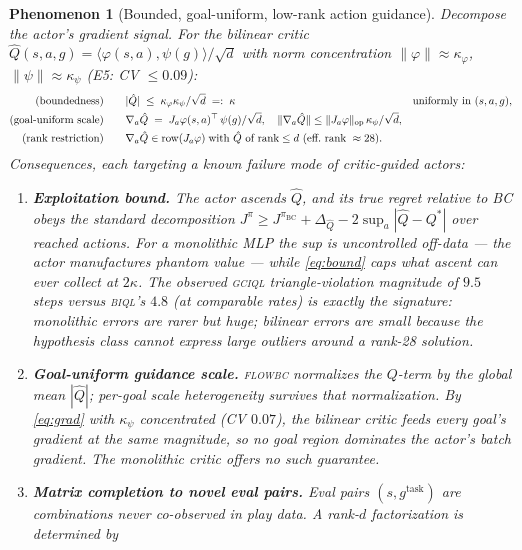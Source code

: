 \documentclass[10pt]{article}
\newtheorem{phenomenon}{Phenomenon}
\newcommand{\ip}[2]{\langle #1, #2 \rangle}
\begin{document}
\begin{phenomenon}[Bounded, goal-uniform, low-rank action guidance]\label{ph:mechanism}
Decompose the actor's gradient signal. For the bilinear critic
$\hat Q(s,a,g)=\ip{\varphi(s,a)}{\psi(g)}/\sqrt d$ with norm concentration
$\|\varphi\|\approx\kappa_\varphi$, $\|\psi\|\approx\kappa_\psi$ (E5: CV $\le0.09$):
\begin{align}
\text{(boundedness)}\qquad & |\hat Q| \;\le\; \kappa_\varphi\kappa_\psi/\sqrt d \;=:\;\kappa
&&\text{uniformly in } (s,a,g),\label{eq:bound}\\
\text{(goal-uniform scale)}\qquad & \nabla_a \hat Q \;=\; J_a\varphi(s,a)^\top\,\psi(g)/\sqrt d,
\quad \|\nabla_a \hat Q\|\le \|J_a\varphi\|_{\mathrm{op}}\,\kappa_\psi/\sqrt d,\label{eq:grad}\\
\text{(rank restriction)}\qquad & \nabla_a\hat Q \in
\operatorname{row}(J_a\varphi)\;\text{with } \hat Q \text{ of rank} \le d\ (\text{eff.\ rank }\approx 28).\notag
\end{align}
Consequences, each targeting a known failure mode of critic-guided actors:
\begin{enumerate}[label=(\alph*)]
\item \textbf{Exploitation bound.} The actor ascends $\hat Q$, and its true regret relative
to BC obeys the standard decomposition
$J^{\pi}\ge J^{\pi_{\mathrm{BC}}}+\Delta_{\hat Q}-2\sup_{a}|\hat Q-Q^*|$ over reached
actions. For a monolithic MLP the sup is uncontrolled off-data --- the actor manufactures
phantom value --- while \eqref{eq:bound} caps what ascent can ever collect at $2\kappa$.
The observed \textsc{gciql} triangle-violation \emph{magnitude} of $9.5$ steps versus
\textsc{biql}'s $4.8$ (at comparable rates) is exactly the signature: monolithic errors are
rarer but huge; bilinear errors are small because the hypothesis class cannot express large
outliers around a rank-28 solution.
\item \textbf{Goal-uniform guidance scale.} \textsc{flowbc} normalizes the $Q$-term by the
\emph{global} mean $|\hat Q|$; per-goal scale heterogeneity survives that normalization.
By \eqref{eq:grad} with $\kappa_\psi$ concentrated (CV $0.07$), the bilinear critic feeds
every goal's gradient at the same magnitude, so no goal region dominates the actor's
batch gradient. The monolithic critic offers no such guarantee.
\item \textbf{Matrix completion to novel eval pairs.} Eval pairs $(s,g^{\mathrm{task}})$
are combinations never co-observed in play data. A rank-$d$ factorization is determined by

\end{enumerate}
\end{phenomenon}
\end{document}
